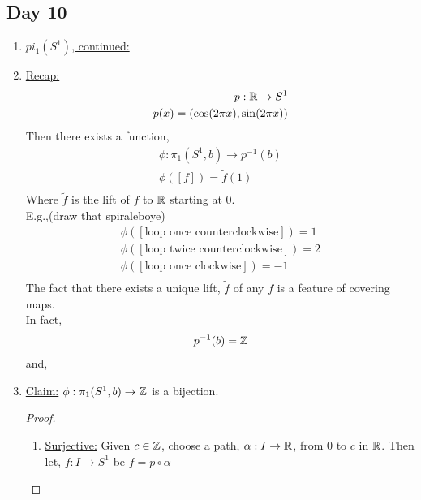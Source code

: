 \subsection{Day 10}
    \begin{enumerate}
        \item \underline{$pi_1(S^1)$, continued:}
        \item \underline{Recap:}
            \begin{align*}
                p: \mathbb{R} \rightarrow S^{1}\\
                p(x)=(\cos(2\pi x), \sin(2\pi x))\\
            \end{align*}
            Then there exists a function,
            \begin{align*}
                \phi : \pi_1(S^{1}, b)\rightarrow p^{-1}(b)\\
                \phi([f])=\tilde{f}(1)\\
            \end{align*}
            Where $\tilde{f}$ is the lift of $f$ to $\mathbb{R}$ starting at $0$.\\
            E.g.,(draw that spiraleboye)
            \begin{align*}
                \phi([\text{loop once counterclockwise}])=1\\
                \phi([\text{loop twice counterclockwise}])=2\\
                \phi([\text{loop once clockwise}])=-1\\
            \end{align*}
            The fact that there exists a unique lift, $\tilde{f}$ of any $f$ is a feature
            of covering maps.\\
            In fact,
            \begin{align*}
                p^{-1}(b)=\mathbb{Z}\\
            \end{align*}
            and,\\
        \item \underline{Claim:} $\phi: \pi_1(S^1, b)\rightarrow \mathbb{Z}$ is a bijection.
            \begin{proof}
                \begin{enumerate}
                    \item \underline{Surjective:} Given $c\in\mathbb{Z}$, choose a path, $\alpha: I \rightarrow \mathbb{R}$, from
                        $0$ to $c$ in $\mathbb{R}$. Then let, $f: I \rightarrow S^1$ be $f=p\circ \alpha$\\

\end{enumerate}
\end{proof}
\end{enumerate}

